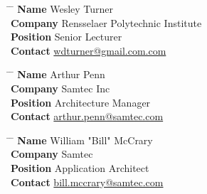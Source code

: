 \documentclass[10pt]{article} %
\begin{document}
\parbox{0.5\textwidth}{ %
\begin{tabbing}
\hspace{2.75cm} \= \hspace{4cm} \= \kill %
{\bf Name} \> Wesley Turner \\ %
{\bf Company} \> Rensselaer Polytechnic Institute \\ %
{\bf Position} \> Senior Lecturer \\ %
{\bf Contact} \> \href{mailto:wdturner@gmail.com}{wdturner@gmail.com.com} %
\end{tabbing}}
\hfill %
\parbox{0.5\textwidth}{ %
\begin{tabbing}
\hspace{2.75cm} \= \hspace{4cm} \= \kill %
{\bf Name} \> Arthur Penn\\ %
{\bf Company} \> Samtec Inc\\ %
{\bf Position} \> Architecture Manager \\ %
{\bf Contact} \> \href{mailto:arthur.penn@samtec.com}{arthur.penn@samtec.com} %
\end{tabbing}}
\hfill %
\parbox{0.5\textwidth}{ %
\begin{tabbing}
\hspace{2.75cm} \= \hspace{4cm} \= \kill %
{\bf Name} \> William "Bill" McCrary\\ %
{\bf Company} \> Samtec \\ %
{\bf Position} \> Application Architect \\ %
{\bf Contact} \> \href{mailto:bill.mccrary@samtec.com}{bill.mccrary@samtec.com} %
\end{tabbing}}

\end{document}

